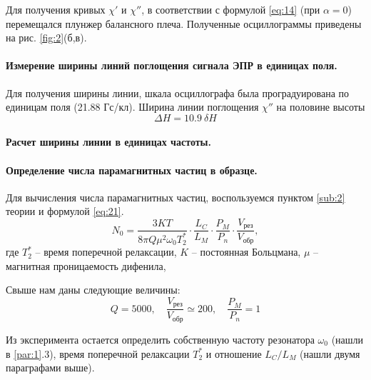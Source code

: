 Для получения кривых $\chi'$ и $\chi''$, в соответствии с формулой \eqref{eq:14} (при $\alpha = 0$) перемещался плунжер балансного плеча. Полученные осциллограммы
приведены на рис. \ref{fig:2}(б,в).

\paragraph{Измерение ширины линий поглощения сигнала ЭПР в единицах поля.}%
Для получения ширины линии, шкала осциллографа была проградуирована по единицам поля (21.88
Гс/кл). Ширина линии поглощения $\chi''$ на половине высоты 
$$\Delta H = 10.9 ~\delta H$$

\paragraph{Расчет ширины линии в единицах частоты.}

\paragraph{Определение числа парамагнитных частиц в образце.}%
Для вычисления числа парамагнитных частиц, воспользуемся пунктом \ref{sub:2} теории и формулой \eqref{eq:21}.
\begin{equation}
    \label{eq:21a}
    N_0 = \frac{3KT}{8 \pi Q \mu^2 \omega_0 T^*_2} \cdot \frac{L_C}{L_M} \cdot \frac{P_M}{P_n} \cdot \frac{V_{\text{рез}}}{V_{\text{обр}}},
\end{equation}
где $T_2^*$ -- время поперечной релаксации,  $K$ -- постоянная Больцмана,  $\mu$ -- магнитная проницаемость дифенила,

Свыше нам даны следующие величины:
\begin{equation}
    \label{eq:}
    Q = 5000, \quad \frac{V_{\text{рез}}}{V_{\text{обр}}} \simeq 200, \quad \frac{P_M}{P_n} = 1
\end{equation}

Из эксперимента остается определить собственную частоту резонатора $\omega_{0}$ (нашли в \ref{par:1}.3), время поперечной релаксации $T^*_2$ и отношение  $L_C / L_M$ (нашли двумя параграфами выше). 


